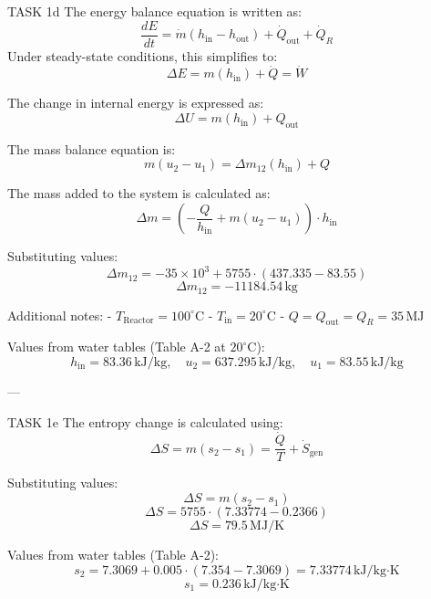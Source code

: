 TASK 1d  
The energy balance equation is written as:  
\[
\frac{dE}{dt} = \dot{m} (h_{\text{in}} - h_{\text{out}}) + \dot{Q}_{\text{out}} + \dot{Q}_R
\]  
Under steady-state conditions, this simplifies to:  
\[
\Delta E = m (h_{\text{in}}) + \dot{Q} = \dot{W}
\]  

The change in internal energy is expressed as:  
\[
\Delta U = m (h_{\text{in}}) + Q_{\text{out}}
\]  

The mass balance equation is:  
\[
m (u_2 - u_1) = \Delta m_{12} (h_{\text{in}}) + Q
\]  

The mass added to the system is calculated as:  
\[
\Delta m = \left( -\frac{Q}{h_{\text{in}}} + m (u_2 - u_1) \right) \cdot h_{\text{in}}
\]  

Substituting values:  
\[
\Delta m_{12} = -35 \times 10^3 + 5755 \cdot (437.335 - 83.55)
\]  
\[
\Delta m_{12} = -11184.54 \, \text{kg}
\]  

Additional notes:  
- \( T_{\text{Reactor}} = 100^\circ\text{C} \)  
- \( T_{\text{in}} = 20^\circ\text{C} \)  
- \( Q = Q_{\text{out}} = Q_R = 35 \, \text{MJ} \)  

Values from water tables (Table A-2 at \( 20^\circ\text{C} \)):  
\[
h_{\text{in}} = 83.36 \, \text{kJ/kg}, \quad u_2 = 637.295 \, \text{kJ/kg}, \quad u_1 = 83.55 \, \text{kJ/kg}
\]  

---

TASK 1e  
The entropy change is calculated using:  
\[
\Delta S = m (s_2 - s_1) = \frac{\dot{Q}}{T} + \dot{S}_{\text{gen}}
\]  

Substituting values:  
\[
\Delta S = m (s_2 - s_1)
\]  
\[
\Delta S = 5755 \cdot (7.33774 - 0.2366)
\]  
\[
\Delta S = 79.5 \, \text{MJ/K}
\]  

Values from water tables (Table A-2):  
\[
s_2 = 7.3069 + 0.005 \cdot (7.354 - 7.3069) = 7.33774 \, \text{kJ/kg·K}
\]  
\[
s_1 = 0.236 \, \text{kJ/kg·K}
\]  

